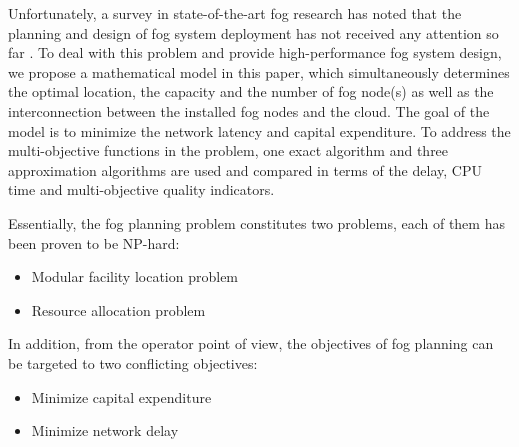 \documentclass[10pt,journal,compsoc]{IEEEtran}
\begin{document}
Unfortunately, a survey in state-of-the-art fog research has noted that the planning and design of fog system deployment has not received any attention so far \cite{mouradian2017comprehensive}. To deal with this problem and provide high-performance fog system design, we propose a mathematical model in this paper, which simultaneously determines the optimal location, the capacity and the number of fog node(s) as well as the interconnection between the installed fog nodes and the cloud. The goal of the model is to minimize the network latency and capital expenditure. To address the multi-objective functions in the problem, one exact algorithm and three approximation algorithms are used and compared in terms of the delay, CPU time and multi-objective quality indicators. 


Essentially, the fog planning problem constitutes two problems, each of them has been proven to be NP-hard:
\begin{itemize}
\item Modular facility location problem
\item Resource allocation problem
\end{itemize}
In addition, from the operator point of view, the objectives of fog planning can be targeted to two conflicting objectives:
\begin{itemize}
\item Minimize capital expenditure
\item Minimize network delay
\end{itemize}
\end{document}
